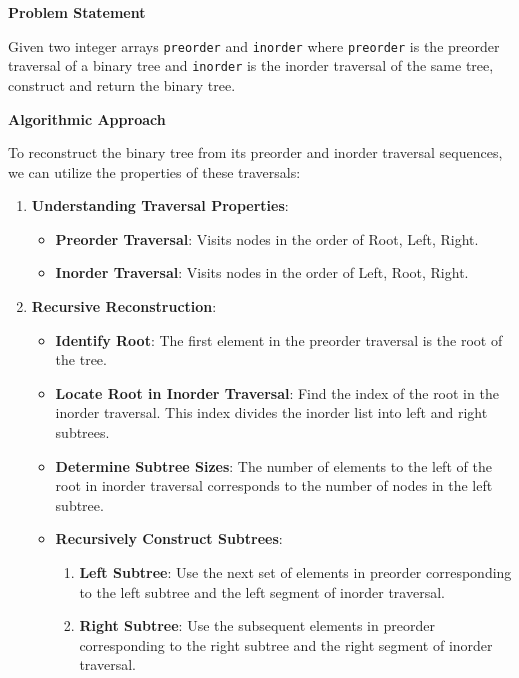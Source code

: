 

\textbf{Problem Statement}

Given two integer arrays \texttt{preorder} and \texttt{inorder} where \texttt{preorder} is the preorder traversal of a binary tree and \texttt{inorder} is the inorder traversal of the same tree, construct and return the binary tree.

\textbf{Algorithmic Approach}

To reconstruct the binary tree from its preorder and inorder traversal sequences, we can utilize the properties of these traversals:

\begin{enumerate}
    \item \textbf{Understanding Traversal Properties}:
    \begin{itemize}
        \item \textbf{Preorder Traversal}: Visits nodes in the order of Root, Left, Right.
        \item \textbf{Inorder Traversal}: Visits nodes in the order of Left, Root, Right.
    \end{itemize}
    
    \item \textbf{Recursive Reconstruction}:
    \begin{itemize}
        \item \textbf{Identify Root}: The first element in the preorder traversal is the root of the tree.
        \item \textbf{Locate Root in Inorder Traversal}: Find the index of the root in the inorder traversal. This index divides the inorder list into left and right subtrees.
        \item \textbf{Determine Subtree Sizes}: The number of elements to the left of the root in inorder traversal corresponds to the number of nodes in the left subtree.
        \item \textbf{Recursively Construct Subtrees}:
        \begin{enumerate}
            \item \textbf{Left Subtree}: Use the next set of elements in preorder corresponding to the left subtree and the left segment of inorder traversal.
            \item \textbf{Right Subtree}: Use the subsequent elements in preorder corresponding to the right subtree and the right segment of inorder traversal.
        \end{enumerate}
    \end{itemize}
\end{enumerate}

